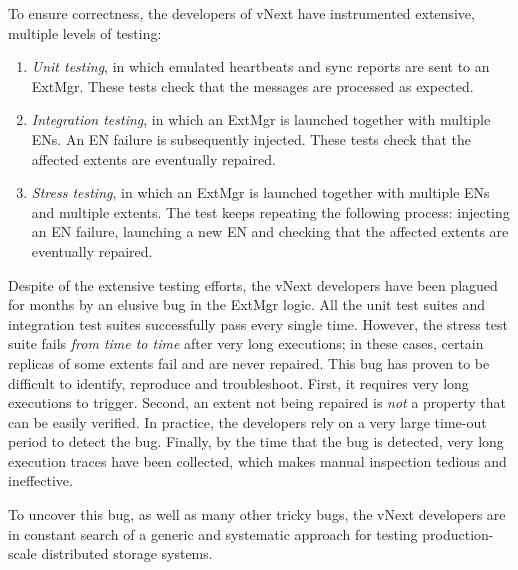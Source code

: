 To ensure correctness, the developers of vNext have instrumented extensive, multiple levels of testing:
\begin{enumerate}
\item \emph{Unit testing}, in which emulated heartbeats and sync reports are sent to an ExtMgr. These tests check that the messages are processed as expected.

\item \emph{Integration testing}, in which an ExtMgr is launched together with multiple ENs. An EN failure is subsequently injected. These tests check that the affected extents are eventually repaired.

\item \emph{Stress testing}, in which an ExtMgr is launched together with multiple ENs and multiple extents. The test keeps repeating the following process: injecting an EN failure, launching a new EN and checking that the affected extents are eventually repaired.
\end{enumerate}

\noindent
Despite of the extensive testing efforts, the vNext developers have been plagued for months by an elusive bug in the ExtMgr logic. All the unit test suites and integration test suites successfully pass every single time. However, the stress test suite fails \emph{from time to time} after very long executions; in these cases, certain replicas of some extents fail and are never repaired. This bug has proven to be difficult to identify, reproduce and troubleshoot. First, it requires very long executions to trigger. Second, an extent not being repaired is \emph{not} a property that can be easily verified. In practice, the developers rely on a very large time-out period to detect the bug. Finally, by the time that the bug is detected, very long execution traces have been collected, which makes manual inspection tedious and ineffective.

To uncover this bug, as well as many other tricky bugs, the vNext developers are in constant search of a generic and systematic approach for testing production-scale distributed storage systems.

